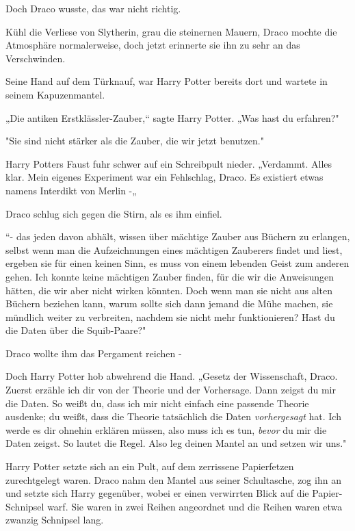{Doch Draco wusste, das war nicht richtig.

Kühl die Verliese von Slytherin, grau die steinernen Mauern, Draco mochte die Atmosphäre normalerweise, doch jetzt erinnerte sie ihn zu sehr an das Verschwinden.

Seine Hand auf dem Türknauf, war Harry Potter bereits dort und wartete in seinem Kapuzenmantel.

„Die antiken Erstklässler-Zauber,“ sagte Harry Potter. „Was hast du erfahren?"

"Sie sind nicht stärker als die Zauber, die wir jetzt benutzen."

Harry Potters Faust fuhr schwer auf ein Schreibpult nieder. „Verdammt. Alles klar. Mein eigenes Experiment war ein Fehlschlag, Draco. Es existiert etwas namens Interdikt von Merlin -„

Draco schlug sich gegen die Stirn, als es ihm einfiel.

“- das jeden davon abhält, wissen über mächtige Zauber aus Büchern zu erlangen, selbst wenn man die Aufzeichnungen eines mächtigen Zauberers findet und liest, ergeben sie für einen keinen Sinn, es muss von einem lebenden Geist zum anderen gehen. Ich konnte keine mächtigen Zauber finden, für die wir die Anweisungen hätten, die wir aber nicht wirken könnten. Doch wenn man sie nicht aus alten Büchern beziehen kann, warum sollte sich dann jemand die Mühe machen, sie mündlich weiter zu verbreiten, nachdem sie nicht mehr funktionieren? Hast du die Daten über die Squib-Paare?"

Draco wollte ihm das Pergament reichen -

Doch Harry Potter hob abwehrend die Hand. „Gesetz der Wissenschaft, Draco. Zuerst erzähle ich dir von der Theorie und der Vorhersage. Dann zeigst du mir die Daten. So weißt du, dass ich mir nicht einfach eine passende Theorie ausdenke; du weißt, dass die Theorie tatsächlich die Daten \emph{vorhergesagt} hat. Ich werde es dir ohnehin erklären müssen, also muss ich es tun, \emph{bevor} du mir die Daten zeigst. So lautet die Regel. Also leg deinen Mantel an und setzen wir uns."

Harry Potter setzte sich an ein Pult, auf dem zerrissene Papierfetzen zurechtgelegt waren. Draco nahm den Mantel aus seiner Schultasche, zog ihn an und setzte sich Harry gegenüber, wobei er einen verwirrten Blick auf die Papier-Schnipsel warf. Sie waren in zwei Reihen angeordnet und die Reihen waren etwa zwanzig Schnipsel lang.

}
